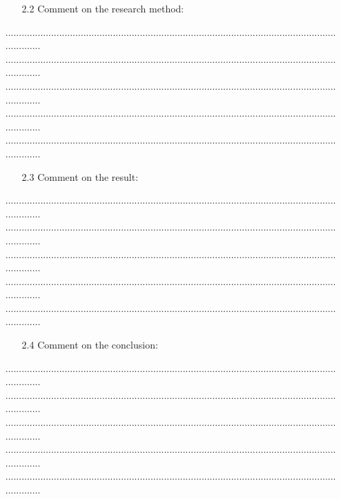 \documentclass[12pt,a4paper]{report}
\begin{document}
\begin{enumerate}
	\begin{enumerate}
		\item[2.2] Comment on the research method:
	\end{enumerate}
	\item[] ........................................................................................................................................\\........................................................................................................................................\\........................................................................................................................................\\........................................................................................................................................\\........................................................................................................................................
	\begin{enumerate}
		\item[2.3] Comment on the result:
	\end{enumerate}
	\item[] ........................................................................................................................................\\........................................................................................................................................\\........................................................................................................................................\\........................................................................................................................................\\........................................................................................................................................
	\begin{enumerate}
		\item[2.4] Comment on the conclusion:
	\end{enumerate}
	\item[] ........................................................................................................................................\\........................................................................................................................................\\........................................................................................................................................\\........................................................................................................................................\\........................................................................................................................................

\end{enumerate}
\end{document}
